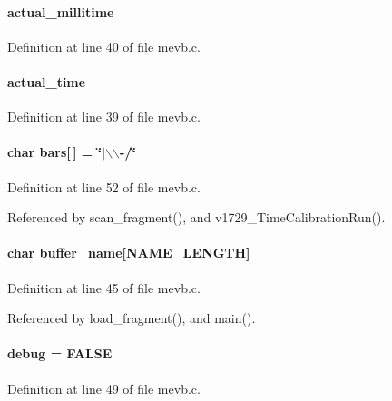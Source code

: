 \paragraph[{actual\_\-millitime}]{ {\bf actual\_\-millitime}}\hfill\label{mevb_8c_a74876f64e556e153bb8cce6dfddce810}


Definition at line 40 of file mevb.c.
\paragraph[{actual\_\-time}]{ {\bf actual\_\-time}}\hfill\label{mevb_8c_a6431147bd66aebfe3ca728d244da1253}


Definition at line 39 of file mevb.c.
\paragraph[{bars}]{\setlength{\rightskip}{0pt plus 5cm}char {\bf bars}\mbox{[}$\,$\mbox{]} = \char`\"{}$|$$\backslash$$\backslash$-\//\char`\"{}}\hfill\label{mevb_8c_a3e94d2c0bc333fdca8dd2a5fae330940}


Definition at line 52 of file mevb.c.

Referenced by scan\_\-fragment(), and v1729\_\-TimeCalibrationRun().
\paragraph[{buffer\_\-name}]{\setlength{\rightskip}{0pt plus 5cm}char {\bf buffer\_\-name}\mbox{[}NAME\_\-LENGTH\mbox{]}}\hfill\label{mevb_8c_a93bc09c1f5f9f26a081d11962971f301}


Definition at line 45 of file mevb.c.

Referenced by load\_\-fragment(), and main().
\paragraph[{debug}]{ {\bf debug} = FALSE}\hfill\label{mevb_8c_a81f0a890e023743f1b88d0cb7d4f74db}


Definition at line 49 of file mevb.c.
